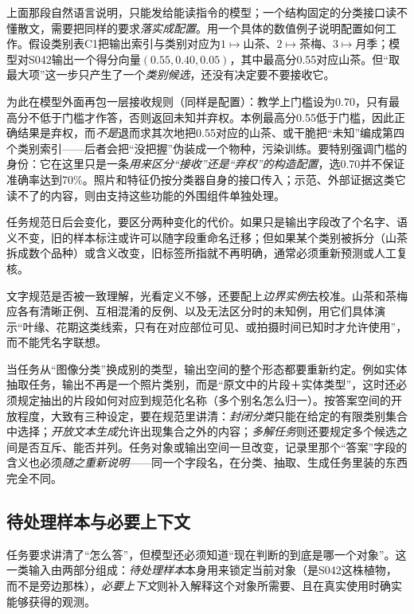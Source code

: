 上面那段自然语言说明，只能发给能读指令的模型；一个结构固定的分类接口读不懂散文，需要把同样的要求\emph{落实成配置}。用一个具体的数值例子说明配置如何工作。假设类别表C1把输出索引与类别对应为$1\mapsto$山茶、$2\mapsto$茶梅、$3\mapsto$月季；模型对S042输出一个得分向量$(0.55,0.40,0.05)$，其中最高分0.55对应山茶。但“取最大项”这一步只产生了一个\emph{类别候选}，还没有决定要不要接收它。

为此在模型外面再包一层接收规则（同样是配置）：教学上门槛设为$0.70$，只有最高分不低于门槛才作答，否则返回未知并弃权。本例最高分0.55低于门槛，因此正确结果是弃权，而\emph{不是}退而求其次地把0.55对应的山茶、或干脆把“未知”编成第四个类别索引——后者会把“没把握”伪装成一个物种，污染训练。要特别强调门槛的身份：它在这里只是一条\emph{用来区分“接收”还是“弃权”的构造配置}，选0.70并不保证准确率达到70\%。照片和特征仍按分类器自身的接口传入；示范、外部证据这类它读不了的内容，则由支持这些功能的外围组件单独处理。

任务规范日后会变化，要区分两种变化的代价。如果只是输出字段改了个名字、语义不变，旧的样本标注或许可以随字段重命名迁移；但如果某个类别被拆分（山茶拆成数个品种）或含义改变，旧标签所指就不再明确，通常必须重新预测或人工复核。

文字规范是否被一致理解，光看定义不够，还要配上\emph{边界实例}去校准。山茶和茶梅应各有清晰正例、互相混淆的反例、以及无法区分时的未知例，用它们具体演示“叶缘、花期这类线索，只有在对应部位可见、或拍摄时间已知时才允许使用”，而不能凭名字联想。

当任务从“图像分类”换成别的类型，输出空间的整个形态都要重新约定。例如实体抽取任务，输出不再是一个照片类别，而是“原文中的片段＋实体类型”，这时还必须规定抽出的片段如何对应到规范化名称（多个别名怎么归一）。按答案空间的开放程度，大致有三种设定，要在规范里讲清：\emph{封闭分类}只能在给定的有限类别集合中选择；\emph{开放文本生成}允许出现集合之外的内容；\emph{多解任务}则还要规定多个候选之间是否互斥、能否并列。任务对象或输出空间一旦改变，记录里那个“答案”字段的含义也必须\emph{随之重新说明}——同一个字段名，在分类、抽取、生成任务里装的东西完全不同。

\subsection{待处理样本与必要上下文}
\label{sec:knowledge-acquisition-sample-context}

任务要求讲清了“怎么答”，但模型还必须知道“现在判断的到底是哪一个对象”。这一类输入由两部分组成：\emph{待处理样本}本身用来锁定当前对象（是S042这株植物，而不是旁边那株），\emph{必要上下文}则补入解释这个对象所需要、且在真实使用时确实能够获得的观测。

